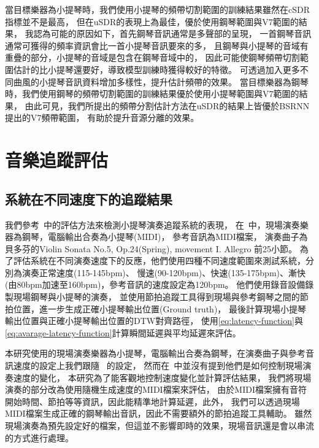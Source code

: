 \documentclass[class=NCU_thesis, crop=false]{standalone}
\begin{document}
當目標樂器為小提琴時，我們使用小提琴的頻帶切割範圍的訓練結果雖然在cSDR指標並不是最高，
但在uSDR的表現上為最佳，優於使用鋼琴範圍與V7範圍的結果，
我認為可能的原因如下，首先鋼琴音訊通常是多聲部的呈現，
一首鋼琴音訊通常可獲得的頻率資訊會比一首小提琴音訊要來的多，
且鋼琴與小提琴的音域有重疊的部分，小提琴的音域是包含在鋼琴音域中的，
因此可能使鋼琴頻帶切割範圍估計的比小提琴還要好，導致模型訓練時獲得較好的特徵。
可透過加入更多不同曲風的小提琴音訊資料增加多樣性，提升估計頻帶的效果。
當目標樂器為鋼琴時，我們使用鋼琴的頻帶切割範圍的訓練結果優於使用小提琴範圍與V7範圍的結果，
由此可見，我們所提出的頻帶分割估計方法在uSDR的結果上皆優於BSRNN提出的V7頻帶範圍，
有助於提升音源分離的效果。

\pagebreak

\section{音樂追蹤評估}

\subsection{系統在不同速度下的追蹤結果} \label{ch4-subst-midi-tracking-results}
我們參考~\cite{Lin2020AHumanComputerDuetSystem}中的評估方法來檢測小提琴演奏追蹤系統的表現，
在~\cite{Lin2020AHumanComputerDuetSystem}中，現場演奏樂器為鋼琴，電腦輸出合奏為小提琴(MIDI)，
參考音訊為MIDI檔案，
演奏曲子為貝多芬的Violin Sonata No.5, Op.24(Spring), movement I. Allegro 前25小節。
為了評估系統在不同演奏速度下的反應，他們使用四種不同速度範圍來測試系統，分別為演奏正常速度(115-145bpm)、
慢速(90-120bpm)、快速(135-175bpm)、漸快(由80bpm加速至160bpm)，參考音訊的速度設定為120bpm。
他們使用錄音設備錄製現場鋼琴與小提琴的演奏，
並使用節拍追蹤工具得到現場與參考鋼琴之間的節拍位置，進一步生成正確小提琴輸出位置(Ground truth)，
最後計算現場小提琴輸出位置與正確小提琴輸出位置的DTW對齊路徑，
使用\cref{eq:latency-function}與\cref{eq:avarage-latency-function}計算瞬間延遲與平均延遲來評估。

本研究使用的現場演奏樂器為小提琴，電腦輸出合奏為鋼琴，在演奏曲子與參考音訊速度的設定上我們跟隨
~\cite{Lin2020AHumanComputerDuetSystem}的設定，
然而在~\cite{Lin2020AHumanComputerDuetSystem}中並沒有提到他們是如何控制現場演奏速度的變化，
本研究為了能客觀地控制速度變化並計算評估結果，
我們將現場演奏的部分改為使用隨機生成速度的MIDI檔案來評估，
由於MIDI檔案擁有音符開始時間、節拍等等資訊，因此能精準地計算延遲，此外，
我們可以透過現場MIDI檔案生成正確的鋼琴輸出音訊，因此不需要額外的節拍追蹤工具輔助。
雖然現場演奏為預先設定好的檔案，但這並不影響即時的效果，現場音訊還是會以串流的方式進行處理。
\end{document}
